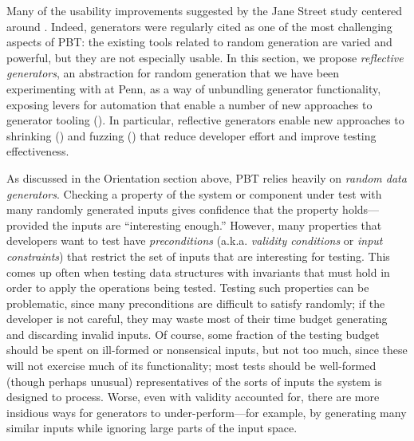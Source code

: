 

%
Many of the usability improvements suggested by the Jane Street study centered
around
.
Indeed, generators were regularly cited as one of the most challenging
aspects of PBT: the existing tools related to random generation are varied
and powerful, but
they are not especially usable.  In this section, we propose {\em reflective
generators}, an abstraction for random generation that we have been
experimenting with at Penn, as a way of unbundling generator
functionality, exposing levers for
automation that enable a number of new approaches to generator
tooling (). In particular, reflective
generators enable new
approaches to shrinking () and fuzzing
()
that reduce developer effort and improve testing
effectiveness.

As discussed in the Orientation section above, PBT relies heavily on {\em random data
generators}.  Checking a property of the system or component under
test with many randomly generated inputs gives confidence that the property
holds---provided the inputs are ``interesting enough.''
%
However,
many properties that developers want to test have {\em preconditions}
(a.k.a.{} {\em validity conditions} or {\em input constraints}) that
restrict the set of inputs that are interesting for testing. This comes up often
when testing data structures with invariants that must hold in order to apply
the operations being tested. Testing such properties can be problematic, since
many preconditions are difficult to satisfy randomly; if the developer is not
careful, they may waste most of their time budget generating and
discarding invalid inputs.
%
Of course, some fraction of the testing budget should be spent on
ill-formed or nonsensical inputs, but not too much, since these will not
exercise much of its functionality; most tests should be well-formed
(though perhaps unusual) representatives of the sorts of inputs the
system is designed to process.
%
Worse, even with validity accounted for, there are
more insidious ways for generators to under-perform---for example, by
generating many similar inputs while ignoring large parts of
the input space.

